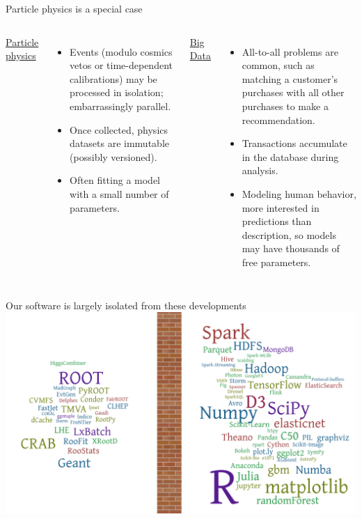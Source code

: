 \documentclass[aspectratio=169]{beamer}
\begin{document}
\begin{frame}{Particle physics is a special case}
\vspace{-0.5 cm}
\begin{columns}[t]
\begin{center}
\underline{\Large Particle physics}
\end{center}

\begin{itemize}
\item Events (modulo cosmics vetos or time-dependent calibrations) may be processed in isolation; embarrassingly parallel.

\item<2-> Once collected, physics datasets are immutable (possibly versioned).

\item<3-> Often fitting a model with a small number of parameters.

\end{itemize}

\begin{center}
\underline{\Large Big Data}
\end{center}

\begin{itemize}
\item All-to-all problems are common, such as matching a customer's purchases with all other purchases to make a recommendation.

\item<2-> Transactions accumulate in the database during analysis.

\item<3-> Modeling human behavior, more interested in predictions than description, so models may have thousands of free parameters.

\end{itemize}

\end{columns}
\end{frame}

\begin{frame}{Our software is largely isolated from these developments}
\vspace{0.17 cm}
\includegraphics[width=\linewidth]{separation-2.png}
\end{frame}
\end{document}
